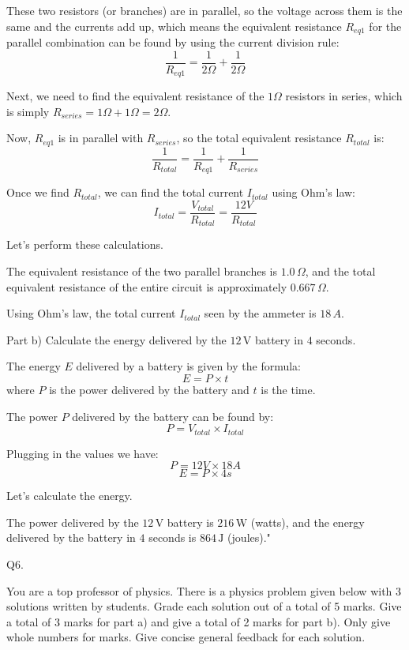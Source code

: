 These two resistors (or branches) are in parallel, so the voltage across them is the same and the currents add up, which means the equivalent resistance \( R_{eq1} \) for the parallel combination can be found by using the current division rule:
\[ \frac{1}{R_{eq1}} = \frac{1}{2\Omega} + \frac{1}{2\Omega} \]

Next, we need to find the equivalent resistance of the \(1\Omega\) resistors in series, which is simply \( R_{series} = 1\Omega + 1\Omega = 2\Omega \).

Now, \( R_{eq1} \) is in parallel with \( R_{series} \), so the total equivalent resistance \( R_{total} \) is:
\[ \frac{1}{R_{total}} = \frac{1}{R_{eq1}} + \frac{1}{R_{series}} \]

Once we find \( R_{total} \), we can find the total current \( I_{total} \) using Ohm's law:
\[ I_{total} = \frac{V_{total}}{R_{total}} = \frac{12V}{R_{total}} \]

Let's perform these calculations.

The equivalent resistance of the two parallel branches is \(1.0 \, \Omega\), and the total equivalent resistance of the entire circuit is approximately \(0.667 \, \Omega\). 

Using Ohm's law, the total current \(I_{total}\) seen by the ammeter is \(18 \, A\).

Part b) Calculate the energy delivered by the \(12\, \text{V}\) battery in \(4\) seconds.

The energy \(E\) delivered by a battery is given by the formula:
\[ E = P \times t \]
where \(P\) is the power delivered by the battery and \(t\) is the time.

The power \(P\) delivered by the battery can be found by:
\[ P = V_{total} \times I_{total} \]

Plugging in the values we have:
\[ P = 12V \times 18A \]
\[ E = P \times 4s \]

Let's calculate the energy.

The power delivered by the \(12\, \text{V}\) battery is \(216 \, \text{W}\) (watts), and the energy delivered by the battery in \(4\) seconds is \(864 \, \text{J}\) (joules)."



                              Q6. 

You are a top professor of physics. There is a physics problem given below with 3 solutions written by students. Grade each solution out of a total of 5 marks. Give a total of 3 marks for part a) and give a total of 2 marks for part b). Only give whole numbers for marks. Give concise general feedback for each solution. 

